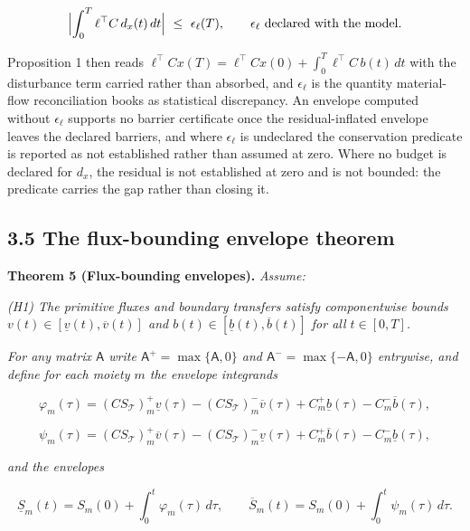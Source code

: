 \documentclass[11pt]{article}
\begin{document}
$$\Bigl|\int_0^T\ell^{\top}C\,d_x(t)\,dt\Bigr|\ \le\ \epsilon_\ell(T), \qquad \epsilon_\ell\ \text{declared with the model}.$$

 Proposition 1 then reads \(\ell^{\top}Cx(T)=\allowbreak{}\ell^{\top}Cx(0)+\allowbreak{}\int_0^T\ell^{\top}C\,\allowbreak{}b(t)\,\allowbreak{}dt\) with the disturbance term carried rather than absorbed, and \(\epsilon_\ell\) is the quantity material-flow reconciliation books as statistical discrepancy. An envelope computed without \(\epsilon_\ell\) supports no barrier certificate once the residual-inflated envelope leaves the declared barriers, and where \(\epsilon_\ell\) is undeclared the conservation predicate is reported as not established rather than assumed at zero. Where no budget is declared for \(d_x\), the residual is not established at zero and is not bounded: the predicate carries the gap rather than closing it.

\subsection*{3.5 The flux-bounding envelope theorem}\label{35-the-flux-bounding-envelope-theorem}

\textbf{Theorem 5 (Flux-bounding envelopes).} \emph{Assume:}

\emph{(H1) The primitive fluxes and boundary transfers satisfy componentwise bounds \(v(t) \in [\underline{v}(t),\allowbreak{} \overline{v}(t)]\) and \(b(t) \in [\underline{b}(t),\allowbreak{} \overline{b}(t)]\) for all \(t \in [0,T]\).}

\emph{For any matrix \(\mathsf{A}\) write \(\mathsf{A}^{+\allowbreak{}} =\allowbreak{} \max\{\mathsf{A},\allowbreak{} 0\}\) and \(\mathsf{A}^{-} =\allowbreak{} \max\{-\mathsf{A},\allowbreak{} 0\}\) entrywise, and define for each moiety \(m\) the envelope integrands} 

$$\varphi_m(\tau) = (C S_{\mathcal{T}})_{m}^{+} \underline{v}(\tau) - (C S_{\mathcal{T}})_{m}^{-} \overline{v}(\tau) + C_{m}^{+} \underline{b}(\tau) - C_{m}^{-} \overline{b}(\tau),$$

 

$$\psi_m(\tau) = (C S_{\mathcal{T}})_{m}^{+} \overline{v}(\tau) - (C S_{\mathcal{T}})_{m}^{-} \underline{v}(\tau) + C_{m}^{+} \overline{b}(\tau) - C_{m}^{-} \underline{b}(\tau),$$

 \emph{and the envelopes} 

$$\underline{S}_m(t) = S_m(0) + \int_0^t \varphi_m(\tau)\, d\tau, \qquad \overline{S}_m(t) = S_m(0) + \int_0^t \psi_m(\tau)\, d\tau.$$
\end{document}
